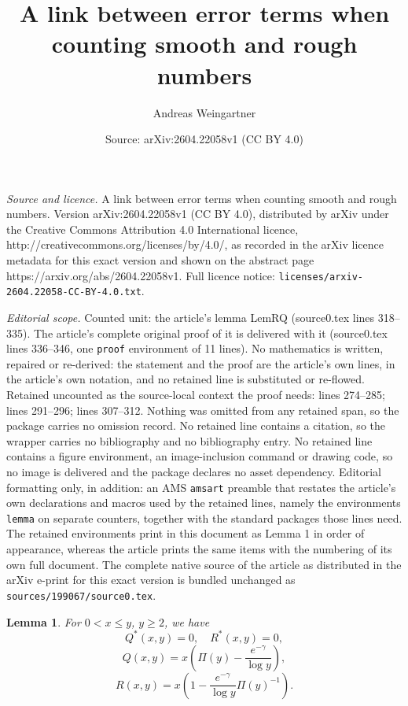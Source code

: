 \documentclass[10pt,a4paper]{amsart}
\title{A link between error terms when counting smooth and rough numbers}
\author{Andreas Weingartner}
\date{Source: arXiv:2604.22058v1 (CC BY 4.0)}
\newtheorem{lemma}{Lemma}
\begin{document}
\maketitle

\noindent\emph{Source and licence.} A link between error terms when counting smooth and rough numbers. Version arXiv:2604.22058v1 (CC BY 4.0), distributed by arXiv under the Creative Commons Attribution 4.0 International licence, http://creativecommons.org/licenses/by/4.0/, as recorded in the arXiv licence metadata for this exact version and shown on the abstract page https://arxiv.org/abs/2604.22058v1. Full licence notice: \texttt{licenses/arxiv-2604.22058-CC-BY-4.0.txt}.\par\smallskip

\noindent\textit{Editorial scope.} Counted unit: the article's lemma LemRQ (source0.tex lines 318--335). The article's complete original proof of it is delivered with it (source0.tex lines 336--346, one \texttt{proof} environment of 11 lines). No mathematics is written, repaired or re-derived: the statement and the proof are the article's own lines, in the article's own notation, and no retained line is substituted or re-flowed.  Retained uncounted as the source-local context the proof needs: lines 274--285; lines 291--296; lines 307--312.  Nothing was omitted from any retained span, so the package carries no omission record.  No retained line contains a citation, so the wrapper carries no bibliography and no bibliography entry.  No retained line contains a figure environment, an image-inclusion command or drawing code, so no image is delivered and the package declares no asset dependency.  Editorial formatting only, in addition: an AMS \texttt{amsart} preamble that restates the article's own declarations and macros used by the retained lines, namely the environments \texttt{lemma} on separate counters, together with the standard packages those lines need.  The retained environments print in this document as Lemma 1 in order of appearance, whereas the article prints the same items with the numbering of its own full document.  The complete native source of the article as distributed in the arXiv e-print for this exact version is bundled unchanged as \texttt{sources/199067/source0.tex}.
\begin{lemma}\label{Lem0}
For $0< x \le y$, $y\ge 2$, we have
$$
Q^*(x,y)=0, \quad R^*(x,y)=0,
$$
$$
Q(x,y) = x\left( \Pi(y) - \frac{e^{-\gamma}}{\log y} \right), 
$$
$$
R(x,y) =  x\left( 1 - \frac{e^{-\gamma}}{\log y}\Pi(y)^{-1} \right) .
$$
\end{lemma}
\end{document}
